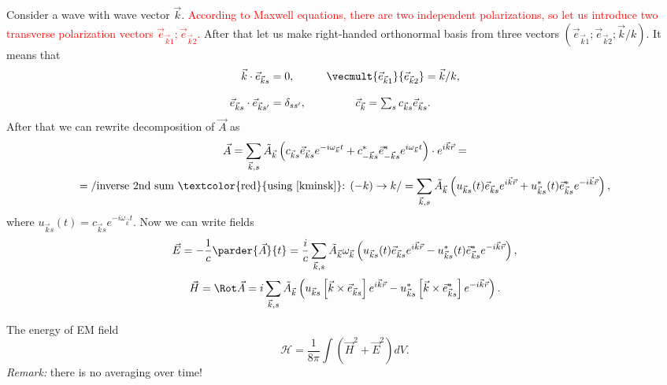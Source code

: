 	Consider a wave with wave vector $\vec{k}$. \textcolor{red}{According to Maxwell equations, there are two independent polarizations, so let us introduce two transverse polarization vectors $\vec{e}_{\vec{k}1}; \vec{e}_{\vec{k}2}$.} After that let us make right-handed orthonormal basis from three vectors $(\vec{e}_{\vec{k}1}; \vec{e}_{\vec{k}2}; \vec{k}/k)$. It means that
	\begin{equation}
		\begin{matrix}
			\vec{k} \cdot \vec{e}_{\vec{k}s} = 0, && \vecmult{\vec{e}_{\vec{k}1}}{\vec{e}_{\vec{k}2}} = \vec{k}/k, \\ \\
			\vec{e}_{\vec{k}s} \cdot \vec{e}_{\vec{k}s'} = \delta_{ss'}, && \vec{c}_{\vec{k}} = \sum_s c_{\vec{k}s} \vec{e}_{\vec{k}s}.
		\end{matrix}
	\end{equation}
	After that we can rewrite decomposition of $\vec{A}$ as
	\begin{multline}
		\vec{A} = \sum_{\vec{k},s} \tilde{A}_{\vec{k}} \left( c_{\vec{k}s} \vec{e}_{\vec{k}s} e^{-i \omega_{\vec{k}} t} + c^*_{-\vec{k}s} \vec{e}^*_{-\vec{k}s}  e^{i \omega_{\vec{k}} t} \right) \cdot e^{i \vec{k} \vec{r}} = \\
		= \left/ \text{inverse 2nd sum \textcolor{red}{using \eqref{kminsk}}: } (-k) \to k \right/ =\sum_{\vec{k},s} \tilde{A}_{\vec{k}} \left( u_{\vec{k}s}(t) \vec{e}_{\vec{k}s} e^{i \vec{k} \vec{r}} + u^*_{\vec{k}s}(t) \vec{e}^*_{\vec{k}s}  e^{-i \vec{k} \vec{r}} \right),
	\end{multline}
	where $u_{\vec{k}s}(t) = c_{\vec{k}s} e^{-i \omega_{\vec{k}} t}$. Now we can write fields
	\begin{equation}
		\vec{E} = -\frac{1}{c} \parder{\vec{A}}{t} = \frac{i}{c} \sum_{\vec{k},s} \tilde{A}_{\vec{k}} \omega_{\vec{k}} \left( u_{\vec{k}s}(t) \vec{e}_{\vec{k}s} e^{i \vec{k} \vec{r}} - u^*_{\vec{k}s}(t) \vec{e}^*_{\vec{k}s}  e^{-i \vec{k} \vec{r}} \right),
	\end{equation}
	\begin{equation}
		\vec{H} = \Rot \vec{A} = i \sum_{\vec{k},s} \tilde{A}_{\vec{k}} \left( u_{\vec{k}s} \left[ \vec{k} \times \vec{e}_{\vec{k}s} \right] e^{i \vec{k} \vec{r}} - u^*_{\vec{k}s} \left[ \vec{k} \times \vec{e}^*_{\vec{k}s} \right] e^{-i \vec{k} \vec{r}} \right).
	\end{equation}
	
	The energy of EM field
	\begin{equation}
		\mathscr{H} = \frac{1}{8 \pi} \int \left(\vec{H}^2 + \vec{E}^2 \right) dV.
	\end{equation} 
	\textit{Remark:} there is no averaging over time!
	
